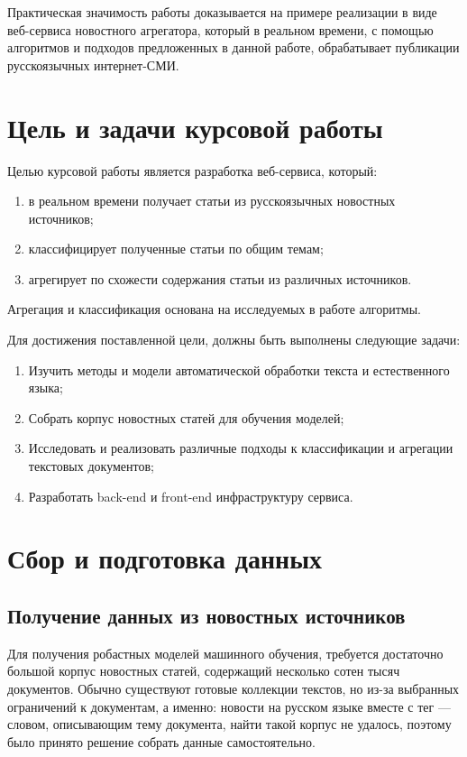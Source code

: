 \documentclass[a4paper, 14pt]{extarticle}
\begin{document}
Практическая значимость работы доказывается на примере реализации в виде веб-сервиса новостного агрегатора,
который в реальном времени, с помощью алгоритмов и подходов предложенных в данной работе,
обрабатывает публикации русскоязычных интернет-СМИ.

\section{Цель и задачи курсовой работы}
Целью курсовой работы является разработка веб-сервиса, который:
\begin{enumerate}
	\item в реальном времени получает статьи из русскоязычных новостных источников;
	\item классифицирует полученные статьи по общим темам;
	\item агрегирует по схожести содержания статьи из различных источников.
\end{enumerate}
Агрегация и классификация основана на исследуемых в работе алгоритмы.

Для достижения поставленной цели, должны быть выполнены следующие задачи:
\begin{enumerate}
	\item Изучить методы и модели автоматической обработки текста и естественного языка;
	\item Собрать корпус новостных статей для обучения моделей;
	\item Исследовать и реализовать различные подходы к классификации и агрегации текстовых документов;
	\item Разработать back-end и front-end инфраструктуру сервиса.
\end{enumerate}

\section{Сбор и подготовка данных}
\subsection{Получение данных из новостных источников}
Для получения робастных моделей машинного обучения, требуется достаточно большой корпус новостных статей,
содержащий несколько сотен тысяч документов. Обычно существуют готовые коллекции текстов, но из-за выбранных 
ограничений к документам, а именно: новости на русском языке вместе с тег --- словом, описывающим тему 
документа, найти такой корпус не удалось, поэтому было принято решение собрать данные самостоятельно.
\end{document}
